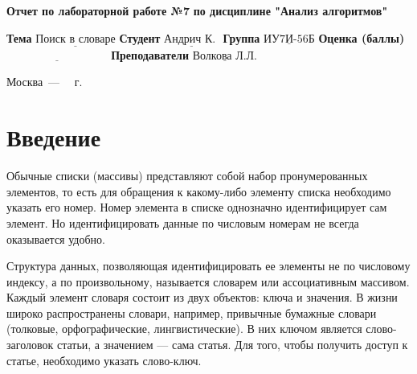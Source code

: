 \documentclass[12pt]{report}
\begin{document}
\begin{titlepage}
	
	\begin{center}
		\noindent\begin{minipage}{1.3\textwidth}\centering
			\Large\textbf{  Отчет по лабораторной работе №7}\newline
			\textbf{по дисциплине "Анализ алгоритмов"}\newline\newline
		\end{minipage}
	\end{center}
	
	\noindent\textbf{Тема} $\underline{\text{Поиск в словаре}}$\newline\newline
	\noindent\textbf{Студент} $\underline{\text{Андрич К. }}$\newline\newline
	\noindent\textbf{Группа} $\underline{\text{ИУ7И-56Б}}$\newline\newline
	\noindent\textbf{Оценка (баллы)} $\underline{\text{~~~~~~~~~~~~~~~~~~~~~~~~~~~}}$\newline\newline
	\noindent\textbf{Преподаватели} $\underline{\text{Волкова Л.Л.}}$\newline\newline\newline
	
	\begin{center}
		\vfill
		Москва~---~\the\year
		~г.
	\end{center}
\end{titlepage}


\tableofcontents

\newpage
\chapter*{Введение}
Обычные списки (массивы) представляют собой набор пронумерованных элементов, то есть для обращения к какому-либо элементу списка необходимо указать его номер. Номер элемента в списке однозначно идентифицирует сам элемент. Но идентифицировать данные по числовым номерам не всегда оказывается удобно. 

Структура данных, позволяющая идентифицировать ее элементы не по числовому индексу, а по произвольному, называется словарем или ассоциативным массивом. Каждый элемент словаря состоит из двух объектов: ключа и значения. 
В жизни широко распространены словари, например, привычные бумажные словари (толковые, орфографические, лингвистические). В них ключом является слово-заголовок статьи, а значением — сама статья. Для того, чтобы получить доступ к статье, необходимо указать слово-ключ.
\end{document}
